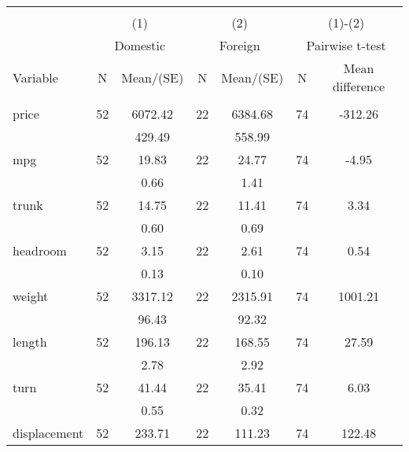 
\begin{tabular}{@{\extracolsep{5pt}}lcccccc}
\\[-1.8ex]\hline \hline \\[-1.8ex]
 & \multicolumn{2}{c}{(1)}  & \multicolumn{2}{c}{(2)}  & \multicolumn{2}{c}{(1)-(2)} \\
 & \multicolumn{2}{c}{Domestic}  & \multicolumn{2}{c}{Foreign}  & \multicolumn{2}{c}{Pairwise t-test}  \\
Variable & N & Mean/(SE) & N & Mean/(SE) & N & Mean difference \\ \hline \\[-1.8ex] 
price   & 52    &   6072.42    & 22    &   6384.68    & 74    &   -312.26   \\
 &   &    429.49  &   &    558.99  &   &   \\
mpg   & 52    &     19.83    & 22    &     24.77    & 74    &     -4.95   \\
 &   &      0.66  &   &      1.41  &   &   \\
trunk   & 52    &     14.75    & 22    &     11.41    & 74    &      3.34   \\
 &   &      0.60  &   &      0.69  &   &   \\
headroom   & 52    &      3.15    & 22    &      2.61    & 74    &      0.54   \\
 &   &      0.13  &   &      0.10  &   &   \\
weight   & 52    &   3317.12    & 22    &   2315.91    & 74    &   1001.21   \\
 &   &     96.43  &   &     92.32  &   &   \\
length   & 52    &    196.13    & 22    &    168.55    & 74    &     27.59   \\
 &   &      2.78  &   &      2.92  &   &   \\
turn   & 52    &     41.44    & 22    &     35.41    & 74    &      6.03   \\
 &   &      0.55  &   &      0.32  &   &   \\
displacement   & 52    &    233.71    & 22    &    111.23    & 74    &    122.48   \\

\end{tabular}
